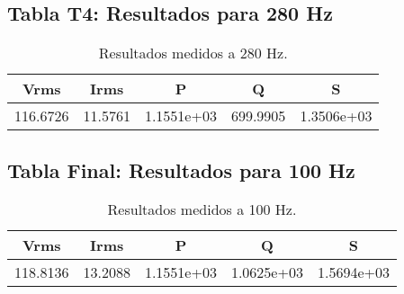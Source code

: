 \documentclass[conference]{IEEEtran}
\theoremstyle{mytheoremstyle}
\theoremstyle{mytheoremstyle}
\theoremstyle{myproblemstyle}
\begin{document}
\subsection*{Tabla T4: Resultados para 280 Hz}
\begin{table}[h!]
    \centering
    \begin{tabular}{@{}ccccc@{}}
        \toprule
        Vrms & Irms & P & Q & S \\ \midrule
        116.6726 & 11.5761 & 1.1551e+03 & 699.9905 & 1.3506e+03 \\ 
        \bottomrule
    \end{tabular}
    \caption{Resultados medidos a 280 Hz.}
\end{table}

\subsection*{Tabla Final: Resultados para 100 Hz}
\begin{table}[h!]
    \centering
    \begin{tabular}{@{}ccccc@{}}
        \toprule
        Vrms & Irms & P & Q & S \\ \midrule
        118.8136 & 13.2088 & 1.1551e+03 & 1.0625e+03 & 1.5694e+03 \\ 
        \bottomrule
    \end{tabular}
    \caption{Resultados medidos a 100 Hz.}
\end{table}
\end{document}
